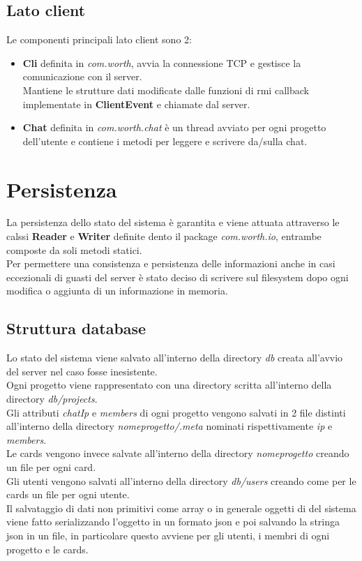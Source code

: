 \documentclass[11pt]{report}
\begin{document}
	\subsection{Lato client}
	Le componenti principali lato client sono 2:
	
	\begin{itemize}
		\item \textbf{Cli} definita in \textit{com.worth}, avvia la connessione TCP e gestisce la comunicazione con il server.\\
		Mantiene le strutture dati modificate dalle funzioni di rmi callback implementate in \textbf{ClientEvent} e chiamate dal server.
		
		\item \textbf{Chat} definita in \textit{com.worth.chat} è un thread avviato per ogni progetto dell'utente e contiene i metodi per leggere e scrivere da/sulla chat.
	\end{itemize}
		 
	
	\section{Persistenza}
	La persistenza dello stato del sistema è garantita e viene attuata attraverso le calssi \textbf{Reader} e \textbf{Writer} definite dento il package \textit{com.worth.io}, entrambe composte da soli metodi statici. \\
	Per permettere una consistenza e persistenza delle informazioni anche in casi eccezionali di guasti del server è stato deciso di scrivere sul filesystem dopo ogni modifica o aggiunta di un informazione in memoria.
	
	\subsection{Struttura database}
	Lo stato del sistema viene salvato all'interno della directory \textit{db} creata all'avvio del server nel caso fosse inesistente.\\
	Ogni progetto viene rappresentato con una directory scritta all'interno della directory \textit{db/projects}. \\
	Gli attributi \textit{chatIp} e \textit{members} di ogni progetto vengono salvati in 2 file distinti all'interno della directory \textit{nomeprogetto/.meta} nominati rispettivamente \textit{ip} e \textit{members}. \\
	Le cards vengono invece salvate all'interno della directory \textit{nomeprogetto} creando un file per ogni card. \\
	Gli utenti vengono salvati all'interno della directory \textit{db/users} creando come per le cards un file per ogni utente. \\
	Il salvataggio di dati non primitivi come array o in generale oggetti di del sistema viene fatto serializzando l'oggetto in un formato json e poi salvando la stringa json in un file, in particolare questo avviene per gli utenti, i membri di ogni progetto e le cards.
	
\end{document}
